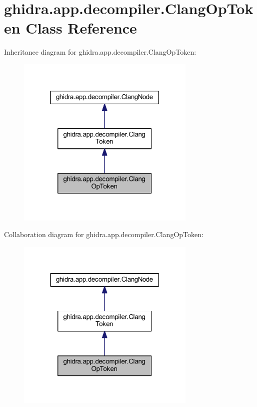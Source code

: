 \hypertarget{classghidra_1_1app_1_1decompiler_1_1_clang_op_token}{}\section{ghidra.\+app.\+decompiler.\+Clang\+Op\+Token Class Reference}
\label{classghidra_1_1app_1_1decompiler_1_1_clang_op_token}


Inheritance diagram for ghidra.\+app.\+decompiler.\+Clang\+Op\+Token\+:
\nopagebreak
\begin{figure}[H]
\begin{center}
\leavevmode
\includegraphics[width=242pt]{classghidra_1_1app_1_1decompiler_1_1_clang_op_token__inherit__graph}
\end{center}
\end{figure}


Collaboration diagram for ghidra.\+app.\+decompiler.\+Clang\+Op\+Token\+:
\nopagebreak
\begin{figure}[H]
\begin{center}
\leavevmode
\includegraphics[width=242pt]{classghidra_1_1app_1_1decompiler_1_1_clang_op_token__coll__graph}
\end{center}
\end{figure}
